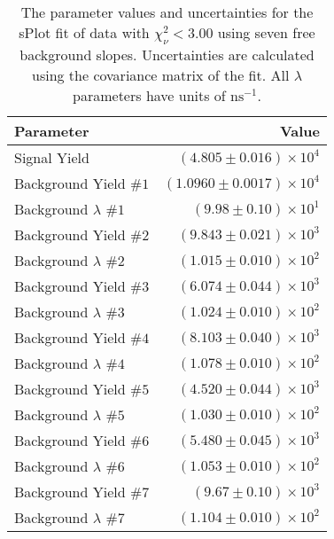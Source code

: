 
\begin{table}[ht]
    \begin{center}
        \begin{tabular}{lr}\toprule
            Parameter & Value \\\midrule
            Signal Yield & $(4.805 \pm 0.016) \times 10^{4}$ \\
            Background Yield $\#1$ & $(1.0960 \pm 0.0017) \times 10^{4}$ \\
            Background $\lambda$ $\#1$ & $(9.98 \pm 0.10) \times 10^{1}$ \\
            Background Yield $\#2$ & $(9.843 \pm 0.021) \times 10^{3}$ \\
            Background $\lambda$ $\#2$ & $(1.015 \pm 0.010) \times 10^{2}$ \\
            Background Yield $\#3$ & $(6.074 \pm 0.044) \times 10^{3}$ \\
            Background $\lambda$ $\#3$ & $(1.024 \pm 0.010) \times 10^{2}$ \\
            Background Yield $\#4$ & $(8.103 \pm 0.040) \times 10^{3}$ \\
            Background $\lambda$ $\#4$ & $(1.078 \pm 0.010) \times 10^{2}$ \\
            Background Yield $\#5$ & $(4.520 \pm 0.044) \times 10^{3}$ \\
            Background $\lambda$ $\#5$ & $(1.030 \pm 0.010) \times 10^{2}$ \\
            Background Yield $\#6$ & $(5.480 \pm 0.045) \times 10^{3}$ \\
            Background $\lambda$ $\#6$ & $(1.053 \pm 0.010) \times 10^{2}$ \\
            Background Yield $\#7$ & $(9.67 \pm 0.10) \times 10^{3}$ \\
            Background $\lambda$ $\#7$ & $(1.104 \pm 0.010) \times 10^{2}$ \\\bottomrule
        \end{tabular}
        \caption{The parameter values and uncertainties for the sPlot fit of data with $\chi^2_\nu < 3.00$ using seven free background slopes. Uncertainties are calculated using the covariance matrix of the fit. All $\lambda$ parameters have units of $\si{\nano\second}^{-1}$.}\label{tab:splot-fit-results-chisqdof-3.00-free-7}
    \end{center}
\end{table}
